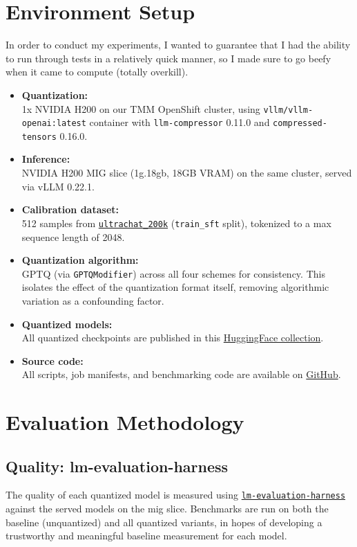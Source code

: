 \documentclass[10pt,twocolumn]{article}
\begin{document}
\section{Environment Setup}
In order to conduct my experiments, I wanted to guarantee that I had the ability to run through tests in a relatively quick manner, so I made sure to go beefy when it came to compute (totally overkill).
\begin{itemize}
  \item \textbf{Quantization:}\\
  1x NVIDIA H200 on our TMM OpenShift cluster, using \texttt{vllm/vllm-openai:latest} container with \texttt{llm-compressor} 0.11.0 and \texttt{compressed-tensors} 0.16.0.
  \item \textbf{Inference:}\\
  NVIDIA H200 MIG slice (1g.18gb, 18GB VRAM) on the same cluster, served via vLLM 0.22.1.
  \item \textbf{Calibration dataset:}\\
  512 samples from \href{https://huggingface.co/datasets/HuggingFaceH4/ultrachat_200k}{\texttt{ultrachat\_200k}} (\texttt{train\_sft} split), tokenized to a max sequence length of 2048.
  \item \textbf{Quantization algorithm:}\\
  GPTQ (via \texttt{GPTQModifier}) across all four schemes for consistency. This isolates the effect of the quantization format itself, removing algorithmic variation as a confounding factor.
  \item \textbf{Quantized models:}\\
  All quantized checkpoints are published in this \href{https://huggingface.co/collections/soyrsoyr/quantized-models}{HuggingFace collection}.
  \item \textbf{Source code:}\\
  All scripts, job manifests, and benchmarking code are available on \href{https://github.com/soyr-redhat/llm-quantization-do-vs-moe}{GitHub}.
\end{itemize}

\section{Evaluation Methodology}

\subsection{Quality: lm-evaluation-harness}
The quality of each quantized model is measured using \href{https://github.com/EleutherAI/lm-evaluation-harness}{\texttt{lm-evaluation-harness}} against the served models on the mig slice. Benchmarks are run on both the baseline (unquantized) and all quantized variants, in hopes of developing a trustworthy and meaningful baseline measurement for each model.
\end{document}
